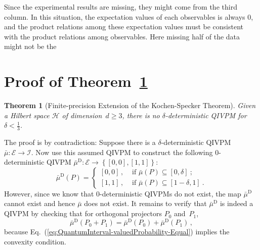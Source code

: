 \documentclass[english,reprint, aps, prl,superscriptaddress, showpacs,
showkeys, longbibliography, amsmath, amssymb, floatfix]{revtex4-1}
\theoremstyle{plain}
\newtheorem{thm}{Theorem}
\theoremstyle{definition}
\newcommand{\Hilb}{\mathcal{H}}
\newcommand{\events}{\ensuremath{\mathcal{E}}}
\newcommand{\imposs}{\ensuremath{\left[0,0\right]}}
\newcommand{\necess}{\ensuremath{\left[1,1\right]}}
\begin{document}
\noindent Since the experimental results are missing, they might come
from the third column. In this situation, the expectation values of
each observables is always $0$, and the product relations among these
expectation values must be consistent with the product relations among
observables. Here missing half of the data might not be the 





\appendix

\section{\label{sec:Proof-of-Theorem}Proof of Theorem~\ref{cor:Kochen-Specker-IVPM}}

\begin{thm}[Finite-precision Extension of the Kochen-Specker Theorem]
\label{cor:Kochen-Specker-IVPM} Given a Hilbert space $\Hilb$ of
dimension~$d\ge3$, there is no $\delta$-deterministic QIVPM for
$\delta<\frac{1}{3}$.\end{thm}

The proof is by contradiction: Suppose there is a $\delta$-deterministic
QIVPM~$\bar{\mu}:\events\rightarrow\mathscr{I}$. Now use this assumed
QIVPM to construct the following $0$-deterministic QIVPM $\bar{\mu}^{\textrm{D}}:\events\rightarrow\left\{ \imposs,\necess\right\} $:
\begin{equation}
\bar{\mu}^{\textrm{D}}\left(P\right)=\begin{cases}
\imposs\,, & \textrm{ if }\bar{\mu}\left(P\right)\subseteq\left[0,\delta\right]\:;\\
\necess\,, & \textrm{ if }\bar{\mu}\left(P\right)\subseteq\left[1-\delta,1\right]\:.
\end{cases}
\end{equation}
However, since we know that $0$-deterministic QIVPMs do not exist,
the map $\bar{\mu}^{\textrm{D}}$ cannot exist and hence $\bar{\mu}$
does not exist. It remains to verify that $\bar{\mu}^{\textrm{D}}$
is indeed a QIVPM by checking that for orthogonal projectors $P_{0}$
and~$P_{1}$, 
\begin{equation}
\bar{\mu}^{\textrm{D}}\left(P_{0}+P_{1}\right)=\bar{\mu}^{\textrm{D}}\left(P_{0}\right)+\bar{\mu}^{\textrm{D}}\left(P_{1}\right)\,,\label{eq:QuantumInterval-valuedProbability-Equal}
\end{equation}
because Eq.~(\ref{eq:QuantumInterval-valuedProbability-Equal}) implies
the convexity condition.
\end{document}
